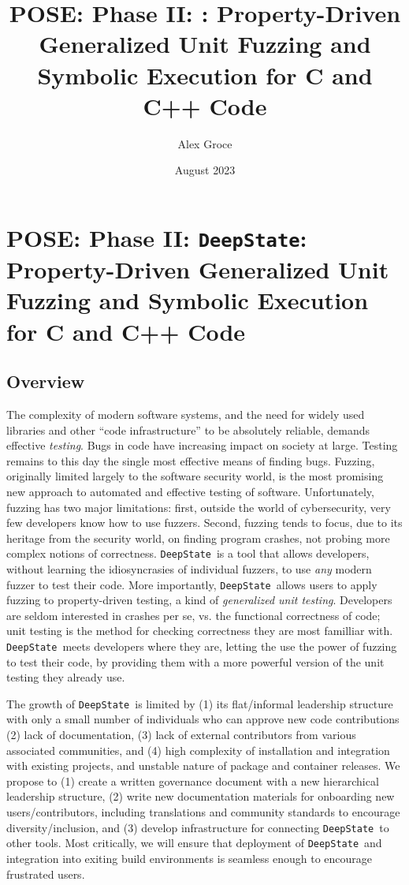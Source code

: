 \documentclass[numbers]{proposalnsf}
\title{POSE: Phase II: \ds: Property-Driven Generalized Unit Fuzzing and Symbolic Execution for C and C++ Code}
\author{Alex Groce }
\date{August 2023}
\newcommand{\ds}{\texttt{DeepState}}
\begin{document}
\section*{POSE: Phase II: \ds: Property-Driven Generalized Unit Fuzzing and Symbolic Execution for C and C++ Code}

\subsection*{Overview}
\vspace{-2mm}


The complexity of modern software systems, and the need for widely used libraries and other ``code infrastructure'' to be absolutely reliable, demands effective \emph{testing}.  Bugs in code have increasing impact on society at large.  Testing remains to this day the single most effective means of finding bugs.   Fuzzing, originally limited largely to the software security world, is the most promising new approach to automated and effective testing of software.  Unfortunately, fuzzing has two major limitations: first, outside the world of cybersecurity, very few developers know how to use fuzzers.  Second, fuzzing tends to focus, due to its heritage from the security world, on finding program crashes, not probing more complex notions of correctness.  \ds\ is a tool that allows developers, without learning the idiosyncrasies of  individual fuzzers, to use \emph{any} modern fuzzer to test their code.  More importantly, \ds\ allows users to apply fuzzing to property-driven testing, a kind of \emph{generalized unit testing}.  Developers are seldom interested in crashes per se, vs. the functional correctness of code; unit testing is the method for checking correctness they are most familliar with.  \ds\ meets developers where they are, letting the use the power of fuzzing to test their code, by providing them with a more powerful version of the unit testing they already  use.

The growth of \ds\ is limited by (1) its flat/informal leadership structure with only a small number of individuals  who can approve new code contributions (2) lack of documentation, (3) lack of external contributors from various associated communities, and (4) high complexity of installation and integration with existing projects, and unstable nature of package and container releases.
We propose to (1) create a written governance document with a new hierarchical leadership structure, (2) write new documentation materials for onboarding new users/contributors, including translations and community standards to encourage diversity/inclusion, and (3) develop infrastructure for connecting \ds\ to other tools.  Most critically, we will ensure that deployment of \ds\ and integration into exiting build environments is seamless enough to encourage frustrated users.
\end{document}
